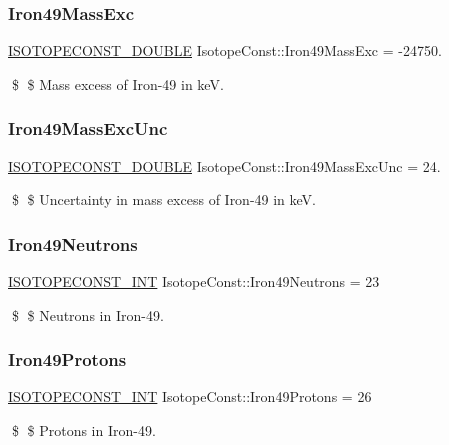 \subsubsection{\texorpdfstring{Iron49\+Mass\+Exc}{Iron49MassExc}}
{\footnotesize\ttfamily \mbox{\hyperlink{group___isotope_const-_macros_ga8f45a7272ce02c0b4c65c44636ed719a}{I\+S\+O\+T\+O\+P\+E\+C\+O\+N\+S\+T\+\_\+\+D\+O\+U\+B\+LE}} Isotope\+Const\+::\+Iron49\+Mass\+Exc = -\/24750.}

\$ \$ Mass excess of Iron-\/49 in keV. \mbox{\label{group___isotope_const-_iron-_fe49_ga377b986e5dadf38ce169534e44e2fc92}} 
\subsubsection{\texorpdfstring{Iron49\+Mass\+Exc\+Unc}{Iron49MassExcUnc}}
{\footnotesize\ttfamily \mbox{\hyperlink{group___isotope_const-_macros_ga8f45a7272ce02c0b4c65c44636ed719a}{I\+S\+O\+T\+O\+P\+E\+C\+O\+N\+S\+T\+\_\+\+D\+O\+U\+B\+LE}} Isotope\+Const\+::\+Iron49\+Mass\+Exc\+Unc = 24.}

\$ \$ Uncertainty in mass excess of Iron-\/49 in keV. \mbox{\label{group___isotope_const-_iron-_fe49_ga89673ac58adbe4cdfc22e4487fe4104b}} 
\subsubsection{\texorpdfstring{Iron49\+Neutrons}{Iron49Neutrons}}
{\footnotesize\ttfamily \mbox{\hyperlink{group___isotope_const-_macros_ga5f18360b3e99483a35c32d789e62621c}{I\+S\+O\+T\+O\+P\+E\+C\+O\+N\+S\+T\+\_\+\+I\+NT}} Isotope\+Const\+::\+Iron49\+Neutrons = 23}

\$ \$ Neutrons in Iron-\/49. \mbox{\label{group___isotope_const-_iron-_fe49_ga0cec6b4431b8ff82c9ce6ce1d24d5a04}} 
\subsubsection{\texorpdfstring{Iron49\+Protons}{Iron49Protons}}
{\footnotesize\ttfamily \mbox{\hyperlink{group___isotope_const-_macros_ga5f18360b3e99483a35c32d789e62621c}{I\+S\+O\+T\+O\+P\+E\+C\+O\+N\+S\+T\+\_\+\+I\+NT}} Isotope\+Const\+::\+Iron49\+Protons = 26}

\$ \$ Protons in Iron-\/49. 